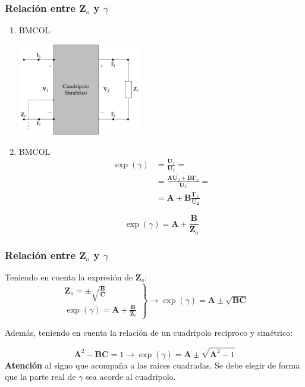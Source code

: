 \subsubsection{Relación entre \(\mathbf{Z}_o\) y \(\gamma\)}
\label{sec:orgba47dd9}
\begin{enumerate}
\item \hfill{}\textsc{BMCOL}
\label{sec:org93db8e6}

\includegraphics[height=4cm]{../figs/cuadripolo_impedancia_caracteristica.pdf}


\item \hfill{}\textsc{BMCOL}
\label{sec:org51048e6}
\begin{align*}
  \exp(\gamma) &= \frac{\mathbf{U}_1}{\mathbf{U}_2} =\\
               &= \frac{\mathbf{A}\mathbf{U}_2 + \mathbf{B}\mathbf{I}'_2}{\mathbf{U}_2} = \\
               &= \mathbf{A} + \mathbf{B}\frac{\mathbf{I}'_2}{\mathbf{U_2}}
\end{align*}

\[
  \boxed{\exp(\gamma) = \mathbf{A} + \frac{\mathbf{B}}{\mathbf{Z}_o}}
\]
\end{enumerate}

\subsubsection{Relación entre \(\mathbf{Z}_o\) y \(\gamma\)}
\label{sec:org2783cff}

Teniendo en cuenta la expresión de \(\mathbf{Z}_o\):
\[
  \left.
  \begin{array}{l}
    \mathbf{Z}_o = \pm \sqrt{\frac{\mathbf{B}}{\mathbf{C}}}\\
    \exp(\gamma) = \mathbf{A} + \frac{\mathbf{B}}{\mathbf{Z}_o}
  \end{array} \right\} \rightarrow
\boxed{\exp(\gamma) = \mathbf{A} \pm \sqrt{\mathbf{B}\mathbf{C}}}
\]

Además, teniendo en cuenta la relación de un cuadripolo recíproco y simétrico:

\[
  \mathbf{A}^2 - \mathbf{B}\mathbf{C} = 1 \rightarrow %
  \boxed{\exp(\gamma) = \mathbf{A} \pm \sqrt{\mathbf{A}^2 - 1}}
\]
\textbf{Atención} al signo que acompaña a las raíces cuadradas. Se debe elegir de forma que la parte real de \(\gamma\) sea acorde al cuadripolo.

